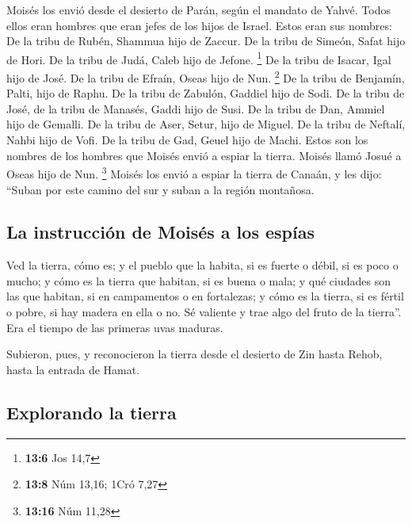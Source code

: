 \begin{paracol}{2}
 Moisés los envió desde el desierto de Parán, según el
mandato de Yahvé. Todos ellos eran hombres que eran jefes de los hijos
de Israel.  Estos eran sus nombres: De la tribu de Rubén,
Shammua hijo de Zaccur.  De la tribu de Simeón, Safat hijo
de Hori.  De la tribu de Judá, Caleb hijo de Jefone.
\footnote{\textbf{13:6} Jos 14,7}  De la tribu de Isacar,
Igal hijo de José.  De la tribu de Efraín, Oseas hijo de
Nun. \footnote{\textbf{13:8} Núm 13,16; 1Cró 7,27}  De la
tribu de Benjamín, Palti, hijo de Raphu.  De la tribu de
Zabulón, Gaddiel hijo de Sodi.  De la tribu de José, de
la tribu de Manasés, Gaddi hijo de Susi.  De la tribu de
Dan, Ammiel hijo de Gemalli.  De la tribu de Aser, Setur,
hijo de Miguel.  De la tribu de Neftalí, Nahbi hijo de
Vofi.  De la tribu de Gad, Geuel hijo de Machi.
 Estos son los nombres de los hombres que Moisés envió a
espiar la tierra. Moisés llamó Josué a Oseas hijo de Nun. \footnote{\textbf{13:16}
  Núm 11,28}  Moisés los envió a espiar la tierra de
Canaán, y les dijo: ``Suban por este camino del sur y suban a la región
montañosa.

\hypertarget{la-instrucciuxf3n-de-moisuxe9s-a-los-espuxedas}{%
\subsection{La instrucción de Moisés a los
espías}\label{la-instrucciuxf3n-de-moisuxe9s-a-los-espuxedas}}

 Ved la tierra, cómo es; y el pueblo que la habita, si es
fuerte o débil, si es poco o mucho;  y cómo es la tierra
que habitan, si es buena o mala; y qué ciudades son las que habitan, si
en campamentos o en fortalezas;  y cómo es la tierra, si
es fértil o pobre, si hay madera en ella o no. Sé valiente y trae algo
del fruto de la tierra''. Era el tiempo de las primeras uvas maduras.

 Subieron, pues, y reconocieron la tierra desde el
desierto de Zin hasta Rehob, hasta la entrada de Hamat.

\hypertarget{explorando-la-tierra}{%
\subsection{Explorando la tierra}\label{explorando-la-tierra}}


\end{paracol}
